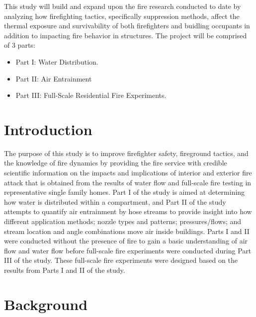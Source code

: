 \documentclass[12pt,oneside]{book}
\begin{document}
This study will build and expand upon the fire research conducted to date by analyzing how firefighting tactics, specifically suppression methods, affect the thermal exposure and survivability of both firefighters and buidling occupants in addition to impacting fire behavior in structures. The project will be comprised of 3 parts:

\vspace*{\baselineskip}
\begin{itemize}
	\item Part I: Water Distribution.
	\item Part II: Air Entrainment
	\item Part III: Full-Scale Residential Fire Experiments.
	\end{itemize}
\vspace*{\baselineskip}

\newpage

\tableofcontents

\newpage

\chapter*{Introduction}

The purpose of this study is to improve firefighter safety, fireground tactics, and the knowledge of fire dynamics by providing the fire service with credible scientific information on the impacts and implications of interior and exterior fire attack that is obtained from the results of water flow and full-scale fire testing in representative single family homes. Part I of the study is aimed at determining how water is distributed within a compartment, and Part II of the study attempts to quantify air entrainment by hose streams to provide insight into how different application methods; nozzle types and patterns; pressures/flows; and stream location and angle combinations move air inside buildings. Parts I and II were conducted without the presence of fire to gain a basic understanding of air flow and water flow before full-scale fire experiments were conducted during Part III of the study. These full-scale fire experiments were designed based on the results from Parts I and II of the study. 

\clearpage

\chapter{Background}
\end{document}
